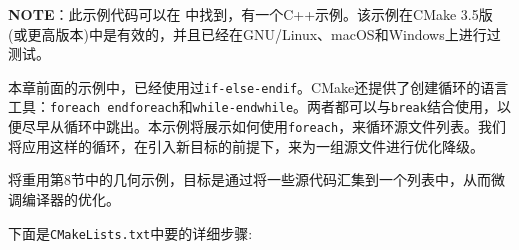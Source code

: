 \begin{myInfoBox}
\textbf{NOTE}：此示例代码可以在  中找到，有一个C++示例。该示例在CMake 3.5版(或更高版本)中是有效的，并且已经在GNU/Linux、macOS和Windows上进行过测试。
\end{myInfoBox}

本章前面的示例中，已经使用过\texttt{if-else-endif}。CMake还提供了创建循环的语言工具：\texttt{foreach endforeach}和\texttt{while-endwhile}。两者都可以与\texttt{break}结合使用，以便尽早从循环中跳出。本示例将展示如何使用\texttt{foreach}，来循环源文件列表。我们将应用这样的循环，在引入新目标的前提下，来为一组源文件进行优化降级。


将重用第8节中的几何示例，目标是通过将一些源代码汇集到一个列表中，从而微调编译器的优化。


下面是\texttt{CMakeLists.txt}中要的详细步骤:

